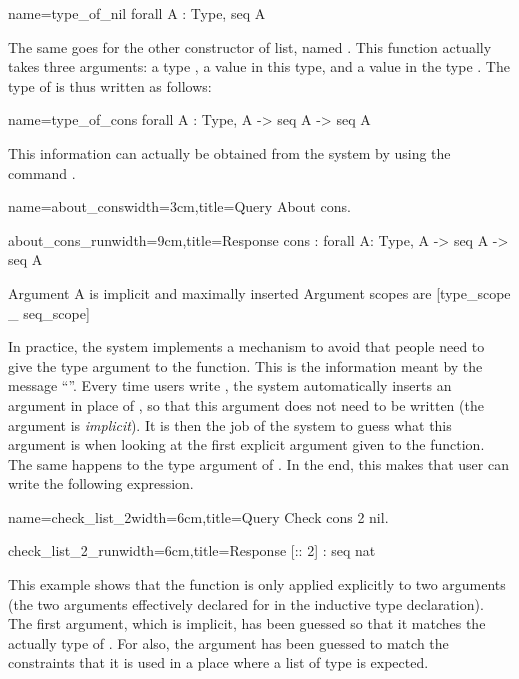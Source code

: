 \begin{coq}{name=type_of_nil}{}
  forall A : Type, seq A
\end{coq}
The same goes for the other constructor of list, named .  This
function actually takes three arguments: a type , a value in this
type, and a value in the type .  The type of  is
thus written as follows:

\begin{coq}{name=type_of_cons}{}
  forall A : Type, A -> seq A -> seq A
\end{coq}
This information can actually be obtained from the system by using the 
command .

\begin{coq}{name=about_cons}{width=3cm,title=Query}
About cons.
$~$
$~$
$~$
\end{coq}
\begin{coqout}{about_cons_run}{width=9cm,title=Response}
cons : forall A: Type, A -> seq A -> seq A

Argument A is implicit and maximally inserted
Argument scopes are [type_scope _ seq_scope]
\end{coqout}
In practice, the \Coq{} system implements a mechanism to avoid that
people need to give the type argument to the  function.  This is
the information meant by the message ``''.  Every time users write , the system automatically
inserts an argument in place of , so that this argument does not
need to be written (the argument is {\em implicit}).  It is then the
job of the \Coq{} system to guess what this argument is when looking at
the first explicit argument given to the function.  The same happens
to the type argument of .  In the end, this makes that user can
write the following expression.

\begin{coq}{name=check_list_2}{width=6cm,title=Query}
Check cons 2 nil.
\end{coq}
\begin{coqout}{check_list_2_run}{width=6cm,title=Response}
[:: 2] : seq nat
\end{coqout}
This example shows that the function  is only applied
explicitly to two arguments (the two arguments effectively declared
for  in the inductive type declaration).
The first argument, which is implicit,
has been guessed so that it matches the actually type of .  For 
 also, the argument has been guessed to match the constraints
that it is used in a place where a list of type  is expected.  

